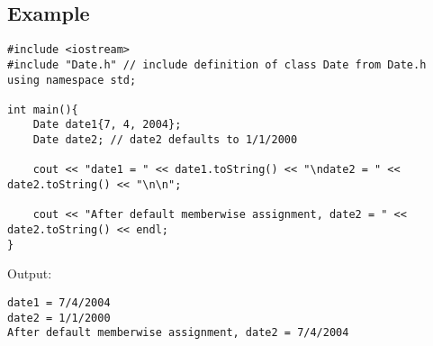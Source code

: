 \subsection{Example}
\begin{minipage}{.5\textwidth}
\end{minipage}\hspace{0.0cm}
\begin{minipage}{.8\textwidth}
\vspace{0.1cm}
\begin{lstlisting}[frame=tlrb,numbers=none,mathescape=true,escapechar=\%,columns=flexible]
#include <iostream>
#include "Date.h" // include definition of class Date from Date.h
using namespace std;

int main(){
    Date date1{7, 4, 2004};
    Date date2; // date2 defaults to 1/1/2000
    
    cout << "date1 = " << date1.toString() << "\ndate2 = " << date2.toString() << "\n\n";
    
    cout << "After default memberwise assignment, date2 = " << date2.toString() << endl;
}
\end{lstlisting}
\end{minipage}

\begin{minipage}{.5\textwidth}
\end{minipage}\hspace{0.0cm}
\begin{minipage}{.8\textwidth}
Output:\\
\vspace{-0.5cm}
\begin{lstlisting}[frame=tlrb,numbers=none,mathescape=true,escapechar=\%,columns=flexible]
date1 = 7/4/2004
date2 = 1/1/2000
After default memberwise assignment, date2 = 7/4/2004
\end{lstlisting}
\end{minipage}